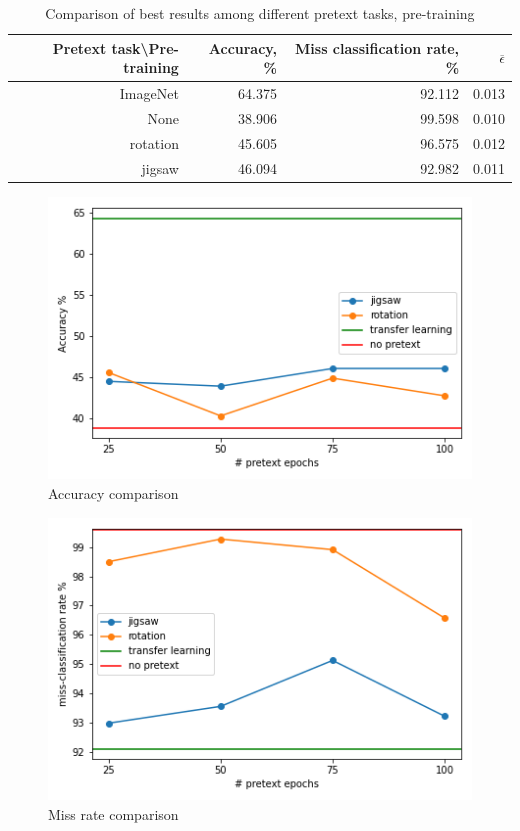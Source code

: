 \begin{table}[h]
    \begin{tabular}{|r|r|r|r|}
        \hline
        Pretext task\textbackslash Pre-training & Accuracy, \% & Miss classification rate, \% & $\overline{\epsilon}$ \\
        \hline
        ImageNet                                & 64.375       & 92.112                       & 0.013                 \\
        None                                    & 38.906       & 99.598                       & 0.010                 \\
        rotation                                & 45.605       & 96.575                       & 0.012                 \\
        jigsaw                                  & 46.094       & 92.982                       & 0.011                 \\
        \hline
    \end{tabular}
    \caption{\label{tab:table-3}Comparison of best results among different pretext tasks, pre-training}
\end{table}

\begin{figure}
    \includegraphics{images/acc}
    \caption{\label{fig:figure-1}Accuracy comparison}
\end{figure}

\begin{figure}
    \includegraphics{images/miss_rate}
    \caption{\label{fig:figure-2}Miss rate comparison}
\end{figure}


